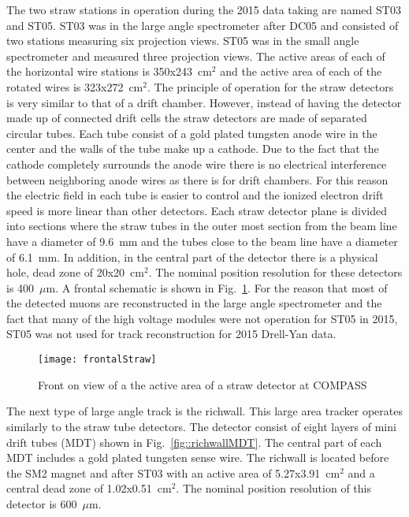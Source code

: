 The two straw stations in operation during the 2015 data taking are named ST03
and ST05.  ST03 was in the large angle spectrometer after DC05 and consisted of
two stations measuring six projection views.  ST05 was in the small angle
spectrometer and measured three projection views.  The active areas of each of
the horizontal wire stations is 350x243~cm$^2$ and the active area of each of
the rotated wires is 323x272~cm$^2$.  The principle of operation for the straw
detectors is very similar to that of a drift chamber.  However, instead of
having the detector made up of connected drift cells the straw detectors are
made of separated circular tubes.  Each tube consist of a gold plated tungsten
anode wire in the center and the walls of the tube make up a cathode.  Due to
the fact that the cathode completely surrounds the anode wire there is no
electrical interference between neighboring anode wires as there is for drift
chambers.  For this reason the electric field in each tube is easier to control
and the ionized electron drift speed is more linear than other detectors.  Each
straw detector plane is divided into sections where the straw tubes in the outer
most section from the beam line have a diameter of 9.6~mm and the tubes close to
the beam line have a diameter of 6.1~mm.  In addition, in the central part of
the detector there is a physical hole, dead zone of 20x20~cm$^2$.  The nominal
position resolution for these detectors is 400~$\mu$m.  A frontal schematic is
shown in Fig.~\ref{fig::frontalStraw}.  For the reason that most of the detected
muons are reconstructed in the large angle spectrometer and the fact that many
of the high voltage modules were not operation for ST05 in 2015, ST05 was not
used for track reconstruction for 2015 Drell-Yan data. \par

\begin{figure}[h!t]
  \centering
  \texttt{[image: frontalStraw]}
  \caption{Front on view of a the active area of a straw detector at COMPASS}
  \label{fig::frontalStraw}
\end{figure}

The next type of large angle track is the richwall.  This large area tracker
operates similarly to the straw tube detectors.  The detector consist of eight
layers of mini drift tubes (MDT) shown in Fig.~\ref{fig::richwallMDT}.  The
central part of each MDT includes a gold plated tungsten sense wire.  The
richwall is located before the SM2 magnet and after ST03 with an active area of
5.27x3.91~cm$^2$ and a central dead zone of 1.02x0.51~cm$^2$.  The nominal
position resolution of this detector is 600~$\mu$m. \par

